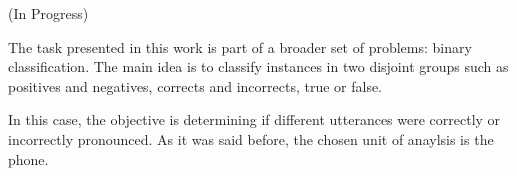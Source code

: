 (In Progress)

The task presented in this work is part of a broader set of problems: binary classification.
The main idea is to classify instances in two disjoint groups such as positives and negatives,
corrects and incorrects, true or false.

In this case, the objective is determining if different utterances were correctly or incorrectly 
pronounced. As it was said before, the chosen unit of anaylsis is the phone.
